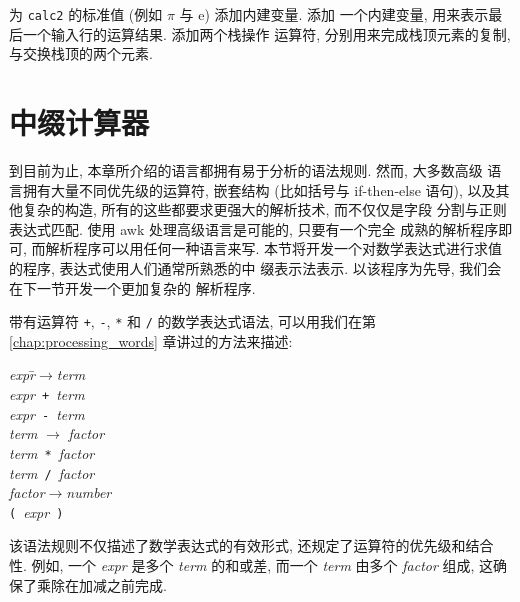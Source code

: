 \begin{exercise}
    \label{exer:calc2}
    为 \texttt{calc2} 的标准值 (例如 $\pi$ 与 $\mathrm{e}$) 添加内建变量.
    添加 一个内建变量, 用来表示最后一个输入行的运算结果. 添加两个栈操作
    运算符, 分别用来完成栈顶元素的复制, 与交换栈顶的两个元素.
\end{exercise}

\section{中缀计算器}
\label{sec:an_infix_calculator}

到目前为止, 本章所介绍的语言都拥有易于分析的语法规则. 然而, 大多数高级
语言拥有大量不同优先级的运算符, 嵌套结构 (比如括号与 if-then-else 语句),
以及其他复杂的构造, 所有的这些都要求更强大的解析技术, 而不仅仅是字段
分割与正则表达式匹配. 使用 awk 处理高级语言是可能的, 只要有一个完全
成熟的解析程序即可, 而解析程序可以用任何一种语言来写.
本节将开发一个对数学表达式进行求值的程序, 表达式使用人们通常所熟悉的中
缀表示法表示. 以该程序为先导, 我们会在下一节开发一个更加复杂的
解析程序.

带有运算符 \verb'+', \verb'-', \verb'*' 和 \verb'/' 的数学表达式语法,
可以用我们在第 \ref{chap:processing_words} 章讲过的方法来描述:
\begin{tabbing}
\indent\textit{expr}\hspace{2em}\=$\to$\hspace{2em}\=\textit{term} \\
\indent\> \> \textit{expr}\ \verb'+'\ \textit{term} \\
\indent\> \> \textit{expr}\ \verb'-'\ \textit{term} \\
\indent\textit{term} \> $\to$ \> \textit{factor} \\
\indent\> \> \textit{term}\ \verb'*'\ \textit{factor} \\
\indent\> \> \textit{term}\ \verb'/'\ \textit{factor} \\
\indent\textit{factor}\>$\to$\>\textit{number} \\
\indent\> \> \verb'('\ \textit{expr}\ \verb')'
\end{tabbing}

该语法规则不仅描述了数学表达式的有效形式, 还规定了运算符的优先级和结合
性. 例如, 一个 \textit{expr} 是多个 \textit{term} 的和或差, 而一个 
\textit{term} 由多个 \textit{factor} 组成, 这确保了乘除在加减之前完成.

